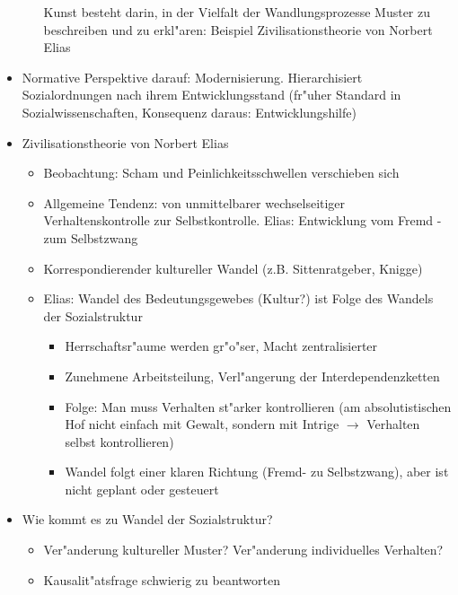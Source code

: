 \begin{itemize}
\begin{itemize}
				Kunst besteht darin, in der Vielfalt der Wandlungsprozesse  Muster zu beschreiben und zu erkl"aren: Beispiel Zivilisationstheorie von Norbert Elias
		\end{itemize}
	\item
		Normative Perspektive darauf: Modernisierung. Hierarchisiert Sozialordnungen nach ihrem Entwicklungsstand (fr"uher Standard in Sozialwissenschaften, Konsequenz daraus: Entwicklungshilfe)
	\item
		Zivilisationstheorie von Norbert Elias
		\begin{itemize}
			\item
				Beobachtung: Scham und Peinlichkeitsschwellen verschieben sich
			\item
				Allgemeine Tendenz: von unmittelbarer wechselseitiger Verhaltenskontrolle zur Selbstkontrolle. Elias: Entwicklung vom Fremd - zum Selbstzwang
			\item
				Korrespondierender kultureller Wandel (z.B. Sittenratgeber, Knigge)
			\item
				Elias: Wandel des Bedeutungsgewebes (Kultur?) ist Folge des Wandels der Sozialstruktur
				\begin{itemize}
					\item
						Herrschaftsr"aume werden gr"o"ser, Macht zentralisierter
					\item
						Zunehmene Arbeitsteilung, Verl"angerung der Interdependenzketten
					\item
						Folge: Man muss Verhalten st"arker kontrollieren (am absolutistischen Hof nicht einfach mit Gewalt, sondern mit Intrige $\rightarrow$ Verhalten selbst kontrollieren)
					\item
						Wandel folgt einer klaren Richtung (Fremd- zu Selbstzwang), aber ist nicht geplant oder gesteuert
				\end{itemize}
		\end{itemize}
	\item
		Wie kommt es zu Wandel der Sozialstruktur?
		\begin{itemize}
			\item
				Ver"anderung kultureller Muster? Ver"anderung individuelles Verhalten?
			\item
				Kausalit"atsfrage schwierig zu beantworten
		\end{itemize}
\end{itemize}
